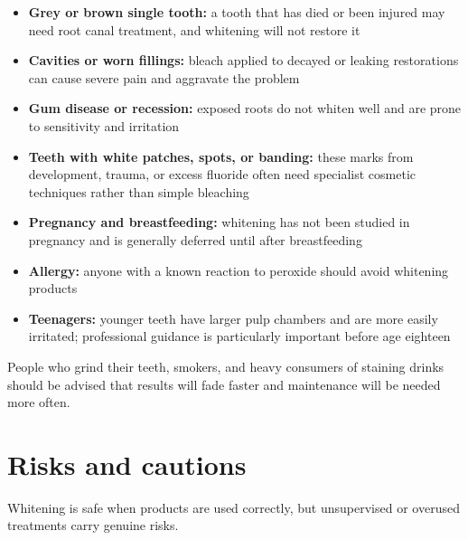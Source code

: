 \begin{itemize}
    \item \textbf{Grey or brown single tooth:} a tooth that has died or been injured may need root canal treatment, and whitening will not restore it
    \item \textbf{Cavities or worn fillings:} bleach applied to decayed or leaking restorations can cause severe pain and aggravate the problem
    \item \textbf{Gum disease or recession:} exposed roots do not whiten well and are prone to sensitivity and irritation
    \item \textbf{Teeth with white patches, spots, or banding:} these marks from development, trauma, or excess fluoride often need specialist cosmetic techniques rather than simple bleaching
    \item \textbf{Pregnancy and breastfeeding:} whitening has not been studied in pregnancy and is generally deferred until after breastfeeding
    \item \textbf{Allergy:} anyone with a known reaction to peroxide should avoid whitening products
    \item \textbf{Teenagers:} younger teeth have larger pulp chambers and are more easily irritated; professional guidance is particularly important before age eighteen
\end{itemize}

People who grind their teeth, smokers, and heavy consumers of staining drinks should be advised that results will fade faster and maintenance will be needed more often.

\section*{Risks and cautions}
Whitening is safe when products are used correctly, but unsupervised or overused treatments carry genuine risks.

